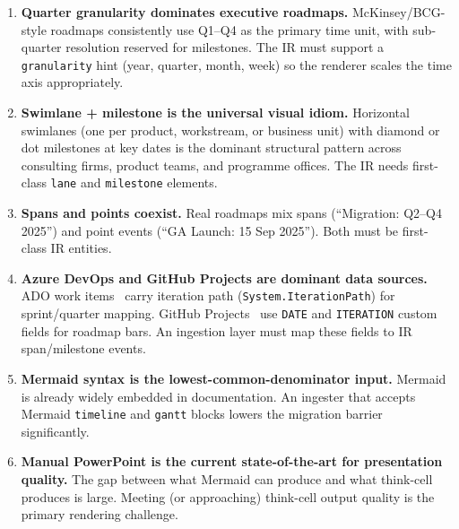 \begin{enumerate}
  \item \textbf{Quarter granularity dominates executive roadmaps.}
        McKinsey/BCG-style roadmaps consistently use Q1--Q4 as the primary
        time unit, with sub-quarter resolution reserved for milestones.
        The IR must support a \texttt{granularity} hint (year, quarter, month,
        week) so the renderer scales the time axis appropriately.

  \item \textbf{Swimlane + milestone is the universal visual idiom.}
        Horizontal swimlanes (one per product, workstream, or business unit)
        with diamond or dot milestones at key dates is the dominant
        structural pattern across consulting firms, product teams, and
        programme offices.
        The IR needs first-class \texttt{lane} and \texttt{milestone} elements.

  \item \textbf{Spans and points coexist.}
        Real roadmaps mix spans (``Migration: Q2--Q4 2025'') and point events
        (``GA Launch: 15 Sep 2025'').
        Both must be first-class IR entities.

  \item \textbf{Azure DevOps and GitHub Projects are dominant data sources.}
        ADO work items~\cite{ado-workitems} carry iteration path
        (\texttt{System.IterationPath}) for sprint/quarter mapping.
        GitHub Projects~\cite{github-projects} use \texttt{DATE} and
        \texttt{ITERATION} custom fields for roadmap bars.
        An ingestion layer must map these fields to IR span/milestone events.

  \item \textbf{Mermaid syntax is the lowest-common-denominator input.}
        Mermaid is already widely embedded in documentation.
        An ingester that accepts Mermaid \texttt{timeline} and \texttt{gantt}
        blocks lowers the migration barrier significantly.

  \item \textbf{Manual PowerPoint is the current state-of-the-art for
        presentation quality.}
        The gap between what Mermaid can produce and what think-cell
        produces is large.
        Meeting (or approaching) think-cell output quality is the primary
        rendering challenge.
\end{enumerate}
